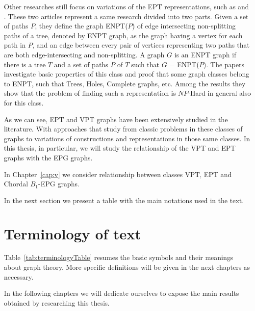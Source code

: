 Other researches still focus on variations of the EPT representations, such as \cite{boyaci2013graphs} and \cite{boyaci2016graphs}. These two articles represent a same research divided into two parts. Given a set of paths $P$, they define the graph ENPT($P$) of edge intersecting non-splitting paths of a tree, denoted by ENPT graph, as the graph having a vertex for each path in $P$, and an edge between every pair of vertices representing two paths that are both edge-intersecting and non-splitting. A graph $G$ is an ENPT graph if there is a tree $T$ and a set of paths $P$ of $T$ such that $G$ = ENPT($P$). The papers investigate basic properties of this class and proof that some graph classes belong to ENPT, such that Trees, Holes, Complete graphs, etc. Among the results they show that the problem of finding such a representation is $NP$-Hard in general also for this class.

As we can see, EPT and VPT graphs have been extensively studied in the literature. With approaches that study from classic problems in these classes of graphs to variations of constructions and representations in those same classes. In this thesis, in particular, we will study the relationship of the VPT and EPT graphs with the EPG graphs.

In Chapter~\ref{cap:v} we consider relationship between classes VPT, EPT and Chordal $B_1$-EPG graphs.

In the next section we present a table with the main notations used in the text.


\section{Terminology of text}

Table~\ref{tab:terminologyTable} resumes the basic symbols and their meanings about graph theory.
More specific definitions will be given in the next chapters as necessary.



In the following chapters we will dedicate ourselves to expose the main results obtained by researching this thesis.